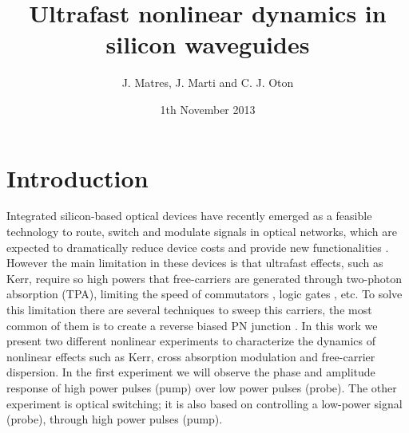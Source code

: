 \documentclass[twocolumn]{el-author}
\date{1th November 2013}
\begin{document}
\title{Ultrafast nonlinear dynamics in silicon waveguides}

\author{J. Matres, J. Marti and C. J. Oton}


\maketitle

\section{Introduction}
Integrated silicon-based optical devices have recently emerged as a feasible technology to route, switch and modulate signals in optical networks, which are expected to dramatically reduce device costs and provide new functionalities \cite{Soref2006}. However the main limitation in these devices is that ultrafast effects, such as Kerr, require so high powers that free-carriers are generated through two-photon absorption (TPA), limiting the speed of commutators \cite{Oton}, logic gates \cite{Oton2010}, etc.
To solve this limitation there are several techniques to sweep this carriers, the most common  of them is to create a reverse biased PN junction \cite{Turner-Foster2010}.
In this work we present two different nonlinear experiments to characterize the dynamics of nonlinear effects such as Kerr, cross absorption modulation and free-carrier dispersion. In the first experiment we will observe the phase and amplitude response of high power pulses (pump) over low power pulses (probe). The other experiment is optical switching; it is also based on controlling a low-power signal (probe), through high power pulses (pump).


 
\end{document}

